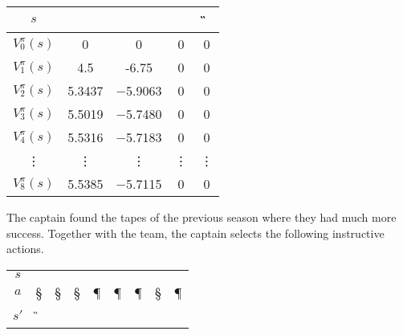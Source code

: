 \documentclass[11pt, a4paper]{article}
\begin{document}
\begin{enumerate}
\begin{solution}
        \begin{table}[h]
            \centering
            \begin{tabular}{c|cccc}
                \toprule
                $s$ & \C & \A & \F & \G \\
                \midrule
                $V_0^\pi(s)$ & 0 & 0 & 0 & 0 \\
                $V_1^\pi(s)$ & 4.5 & -6.75 & 0 & 0 \\
                $V_2^\pi(s)$ & \num{5.3437} & \num{-5.9063} & 0 & 0 \\
                $V_3^\pi(s)$ & \num{5.5019} & \num{-5.7480} & 0 & 0 \\
                $V_4^\pi(s)$ & \num{5.5316} & \num{-5.7183} & 0 & 0 \\
                \vdots       & \vdots & \vdots & \vdots & \vdots \\
                $V_8^\pi(s)$ & \num{5.5385} & \num{-5.7115} & 0 & 0 \\
                \bottomrule
            \end{tabular}
        \end{table}
    \end{solution}

\end{enumerate}

The captain found the tapes of the previous season where they had much more success. Together with the team, the captain selects the following instructive actions.

\begin{table}[h]
    \centering
    \begin{tabular}{c|cccccccc}
        \toprule
         $s$ & \C & \C & \A & \A & \C & \A & \A & \C \\
         $a$ & \S & \S & \S & \P & \P & \P & \S & \P \\
         $s'$ & \G & \C & \F & \C & \C & \C & \F & \F \\
         \bottomrule
    \end{tabular}
\end{table}
\end{document}
